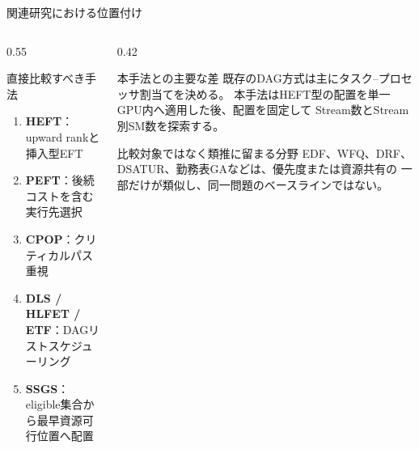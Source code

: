 \documentclass[aspectratio=169,10pt]{beamer}
\begin{document}
\begin{frame}{関連研究における位置付け}
  \small
  \begin{columns}[T,onlytextwidth]
    \begin{column}{0.55\textwidth}
      \begin{block}{直接比較すべき手法}
        \begin{enumerate}
          \item \textbf{HEFT}：upward rankと挿入型EFT
          \item \textbf{PEFT}：後続コストを含む実行先選択
          \item \textbf{CPOP}：クリティカルパス重視
          \item \textbf{DLS / HLFET / ETF}：DAGリストスケジューリング
          \item \textbf{SSGS}：eligible集合から最早資源可行位置へ配置
        \end{enumerate}
      \end{block}
    \end{column}
    \begin{column}{0.42\textwidth}
      \begin{alertblock}{本手法との主要な差}
        既存のDAG方式は主に\alert{タスク--プロセッサ割当て}を決める。
        本手法はHEFT型の配置を単一GPU内へ適用した後、配置を固定して
        \alert{Stream数とStream別SM数}を探索する。
      \end{alertblock}
      \begin{exampleblock}{比較対象ではなく類推に留まる分野}
        EDF、WFQ、DRF、DSATUR、勤務表GAなどは、優先度または資源共有の
        一部だけが類似し、同一問題のベースラインではない。
      \end{exampleblock}
    \end{column}
  \end{columns}
\end{frame}
\end{document}
